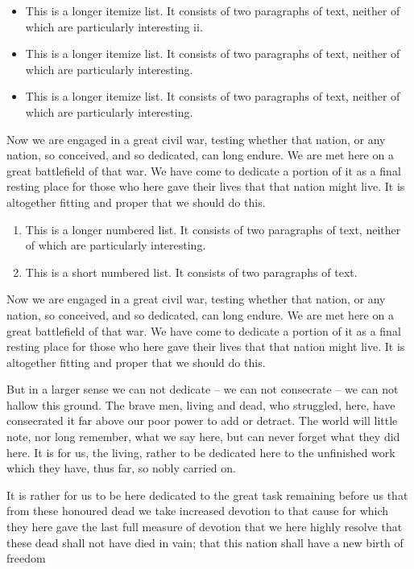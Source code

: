 \documentclass{pasa}%
\begin{document}
\begin{itemize}
\item This is a longer itemize list. It consists of two paragraphs of text, neither of which are particularly interesting {\sc ii}.
\item This is a longer itemize list. It consists of two paragraphs of text, neither of which are particularly interesting.
\item This is a longer itemize list. It consists of two paragraphs of text, neither of which are particularly interesting.
\end{itemize}

Now we are engaged in a great civil war, testing whether that nation, or any nation, so conceived, and so dedicated, can long endure. We are met here on a great battlefield of that war. We have come to dedicate a portion of it as a final resting place for those who here gave their lives that that nation might live. It is altogether fitting and proper that we should do this.

\begin{enumerate}%
\item This is a longer numbered list. It consists of two paragraphs of text, neither of which are particularly interesting.
\item This is a short numbered list. It consists of two paragraphs of text.
\end{enumerate}

Now we are engaged in a great civil war, testing whether that nation, or any nation, so conceived, and so dedicated, can long endure. We are met here on a great battlefield of that war. We have come to dedicate a portion of it as a final resting place for those who here gave their lives that that nation might live. It is altogether fitting and proper that we should do this.

But in a larger sense we can not dedicate -- we can not consecrate -- we can not hallow this ground. The brave men, living and dead, who struggled, here, have consecrated it far above our poor power to add or detract. The world will little note, nor long remember, what we say here, but can never forget what they did here. It is for us, the living, rather to be dedicated here to the unfinished work which they have, thus far, so nobly carried on.

It is rather for us to be here dedicated to the great task remaining before us  that from these honoured dead we take increased devotion to that cause for which they here gave the last full measure of devotion  that we here highly resolve that these dead shall not have died in vain; that this nation shall have a new birth of freedom
\end{document}
